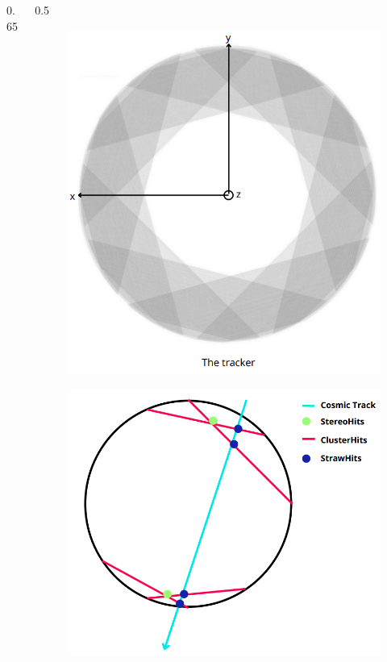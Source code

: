 \documentclass{beamer}
\begin{document}
\begin{frame}
\begin{columns}
\begin{column}{0.65\framewidth}
\begin{itemize}
\end{itemize}
\end{column}
\begin{column}{0.5\framewidth}
      \begin{figure}[!h]
      \centering
            \hspace*{-2em}
\includegraphics[width=0.7\columnwidth]{figures/png/Screenshot_20240526_164527.png}
     \label{fig:normalhits}
\end{figure}
\vspace{-5mm}
         \begin{figure}[!h]
      \centering
      \hspace*{-2em}
      \includegraphics[width=0.9\columnwidth]{figures/png/Screenshot_20240810_210144.png}
     \label{fig:normalhits}
\end{figure}
\end{column}
\end{columns}
\end{frame}
\end{document}
